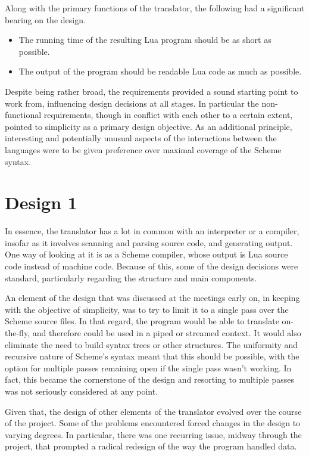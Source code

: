 Along with the primary functions of the translator, the following had a
significant bearing on the design.
\begin{itemize}
\item The running time of the resulting Lua program should be as short as
possible.
\item The output of the program should be readable Lua code as much as possible.
\end{itemize}

Despite being rather broad, the requirements provided a sound starting point to
work from, influencing design decisions at all stages. In particular the
non-functional requirements, though in conflict with each other to a certain
extent, pointed to simplicity as a primary design objective. As an additional
principle, interesting and potentially unusual aspects of the interactions
between the languages were to be given preference over maximal coverage of the
Scheme syntax.


\section{Design 1}

In essence, the translator has a lot in common with an interpreter or a
compiler, insofar as it involves scanning and parsing source code, and
generating output. One way of looking at it is as a Scheme compiler, whose
output is Lua source code instead of machine code. Because of this, some of the
design decisions were standard, particularly regarding the structure and main
components.

An element of the design that was discussed at the meetings early on, in keeping
with the objective of simplicity, was to try to limit it to a single pass over
the Scheme source files. In that regard, the program would be able to translate
on-the-fly, and therefore could be used in a piped or streamed context. It would
also eliminate the need to build syntax trees or other structures. The
uniformity and recursive nature of Scheme's syntax meant that this should be
possible, with the option for multiple passes remaining open if the single pass
wasn't working. In fact, this became the cornerstone of the design and resorting
to multiple passes was not seriously considered at any point.

Given that, the design of other elements of the translator evolved over the
course of the project. Some of the problems encountered forced changes in the
design to varying degrees. In particular, there was one recurring issue, midway
through the project, that prompted a radical redesign of the way the program
handled data.

